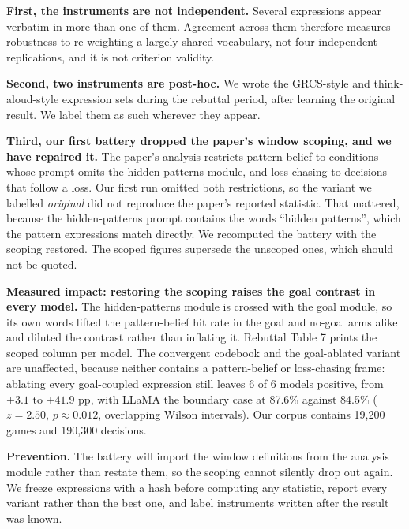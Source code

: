 \textbf{First, the instruments are not independent.} Several expressions appear verbatim in more
than one of them. Agreement across them therefore measures robustness to re-weighting a largely
shared vocabulary, not four independent replications, and it is not criterion validity.

\textbf{Second, two instruments are post-hoc.} We wrote the GRCS-style and think-aloud-style
expression sets during the rebuttal period, after learning the original result. We label them as
such wherever they appear.

\textbf{Third, our first battery dropped the paper's window scoping, and we have repaired it.}
The paper's analysis restricts pattern belief to conditions whose prompt omits the hidden-patterns
module, and loss chasing to decisions that follow a loss. Our first run omitted both restrictions,
so the variant we labelled \emph{original} did not reproduce the paper's reported statistic. That
mattered, because the hidden-patterns prompt contains the words ``hidden patterns'', which the
pattern expressions match directly. We recomputed the battery with the scoping restored. The
scoped figures supersede the unscoped ones, which should not be quoted.

\textbf{Measured impact: restoring the scoping raises the goal contrast in every model.} The
hidden-patterns module is crossed with the goal module, so its own words lifted the pattern-belief
hit rate in the goal and no-goal arms alike and diluted the contrast rather than inflating it.
Rebuttal Table 7 prints the scoped column per model. The convergent codebook and the goal-ablated
variant are unaffected, because neither contains a pattern-belief or loss-chasing frame: ablating
every goal-coupled expression still leaves 6 of 6 models positive, from $+3.1$ to $+41.9$ pp, with
LLaMA the boundary case at 87.6\% against 84.5\% ($z = 2.50$, $p \approx 0.012$, overlapping
Wilson intervals). Our corpus contains 19{,}200 games and 190{,}300 decisions.

\textbf{Prevention.} The battery will import the window definitions from the analysis module
rather than restate them, so the scoping cannot silently drop out again. We freeze expressions
with a hash before computing any statistic, report every variant rather than the best one, and
label instruments written after the result was known.


